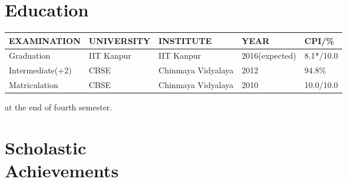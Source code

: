 \documentclass[margin,10pt]{resume}
\renewcommand{\baselinestretch}{1.2}
\begin{document}
\begin{resume}

\section{\mysidestyle Education}
\vspace{2mm}

\begin{table}[h]
\renewcommand{\arraystretch}{1.5}
\vspace{5mm}
\begin{tabular}{lllll}
\hline

EXAMINATION      & UNIVERSITY & INSTITUTE          & YEAR           & CPI/\%    \\ \hline

Graduation       & IIT Kanpur & IIT Kanpur         & 2016(expected) & 8.1*/10.0 \\ \hline

Intermediate(+2) & CBSE       & Chinmaya Vidyalaya & 2012           & 94.8\%    \\ \hline

Matriculation    & CBSE       & Chinmaya Vidyalaya & 2010           & 10.0/10.0    \\ \hline

\end{tabular}

{\vspace{2mm}\small * at the end of fourth semester.}
\end{table}

\vspace{-2mm}
\section{\mysidestyle Scholastic\\Achievements}

\begin{list2}
\begin{spacing}{1.4}
\renewcommand{\baselinestretch}{1.3}


\end{spacing}
\end{list2}
\end{resume}
\end{document}
